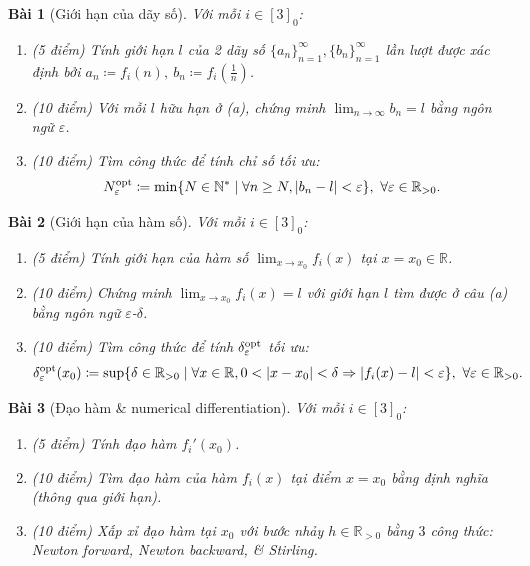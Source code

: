 \documentclass[12pt]{article}
\newtheorem{baitoan}{Bài}
\begin{document}
\begin{baitoan}[Giới hạn của dãy số]
	Với mỗi $i\in[3]_0$:
	\begin{enumerate}[label=(\alph*)]
		\item {\rm(5 điểm)} Tính giới hạn $l$ của 2 dãy số $\{a_n\}_{n=1}^\infty,\{b_n\}_{n=1}^\infty$ lần lượt được xác định bởi $a_n\coloneqq f_i(n),\ b_n\coloneqq f_i\left(\frac{1}{n}\right)$.
		\item {\rm(10 điểm)} Với mỗi $l$ hữu hạn ở (a), chứng minh $\lim_{n\to\infty} b_n = l$ bằng ngôn ngữ $\varepsilon$.
		\item {\rm(10 điểm)} Tìm công thức để tính chỉ số tối ưu:
		\begin{equation*}
			N_\varepsilon^{\rm opt} \coloneqq \min \{ N \in \mathbb{N}^* \mid \forall n\ge N, |b_n - l| < \varepsilon \},\ \forall\varepsilon\in\mathbb{R}_{> 0}.
		\end{equation*}
	\end{enumerate}
\end{baitoan}

\begin{baitoan}[Giới hạn của hàm số]
	Với mỗi $i\in[3]_0$:
	\begin{enumerate}[label=(\alph*)]
		\item {\rm(5 điểm)} Tính giới hạn của hàm số $\lim_{x\to x_0} f_i(x)$ tại $x = x_0\in\mathbb{R}$.
		\item {\rm(10 điểm)} Chứng minh $\lim_{x\to x_0} f_i(x) = l$ với giới hạn $l$ tìm được ở câu (a) bằng ngôn ngữ $\varepsilon$-$\delta$.
		\item {\rm(10 điểm)} Tìm công thức để tính $\delta_\varepsilon^{\rm opt}$ tối ưu:
		\begin{equation*}
			\delta_\varepsilon^{\rm opt}(x_0) \coloneqq \sup \{ \delta \in \mathbb{R}_{>0} \mid \forall x \in \mathbb{R}, 0 < |x - x_0| < \delta \Rightarrow |f_i(x) - l| < \varepsilon \},\ \forall\varepsilon\in\mathbb{R}_{> 0}.
		\end{equation*}
	\end{enumerate}
\end{baitoan}

\begin{baitoan}[Đạo hàm \& numerical differentiation]
	Với mỗi $i\in[3]_0$:
	\begin{enumerate}[label=(\alph*)]
		\item {\rm(5 điểm)} Tính đạo hàm $f_i'(x_0)$.
		\item {\rm(10 điểm)} Tìm đạo hàm của hàm $f_i(x)$ tại điểm $x = x_0$ bằng định nghĩa (thông qua giới hạn).
		\item {\rm(10 điểm)} Xấp xỉ đạo hàm tại $x_0$ với bước nhảy $h \in \mathbb{R}_{>0}$ bằng $3$ công thức: Newton forward, Newton backward, \& Stirling.
	\end{enumerate}
\end{baitoan}
\end{document}
